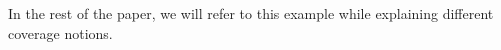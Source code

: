 In the rest of the paper, we will refer to this example while explaining different coverage notions.
\fi


